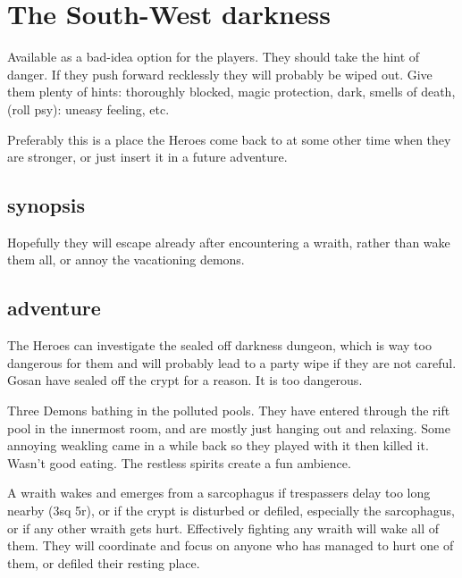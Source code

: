 \section*{The South-West darkness}
Available as a bad-idea option for the players. They should take the hint of danger. If they push forward recklessly they will probably be wiped out. Give them plenty of hints: thoroughly blocked, magic protection, dark, smells of death, (roll psy): uneasy feeling, etc.

Preferably this is a place the Heroes come back to at some other time when they are stronger, or just insert it in a future adventure.


\subsection*{synopsis}
Hopefully they will escape already after encountering a wraith, rather than wake them all, or annoy the vacationing demons.


\subsection*{adventure}
The Heroes can investigate the sealed off darkness dungeon, which is way too dangerous for them and will probably lead to a party wipe if they are not careful. Gosan have sealed off the crypt for a reason. It is too dangerous.

Three Demons bathing in the polluted pools. They have entered through the rift pool in the innermost room, and are mostly just hanging out and relaxing. Some annoying weakling came in a while back so they played with it then killed it. Wasn't good eating. The restless spirits create a fun ambience.

A wraith wakes and emerges from a sarcophagus if trespassers delay too long nearby (3sq 5r), or if the crypt is disturbed or defiled, especially the sarcophagus, or if any other wraith gets hurt. Effectively fighting any wraith will wake all of them. They will coordinate and focus on anyone who has managed to hurt one of them, or defiled their resting place.


